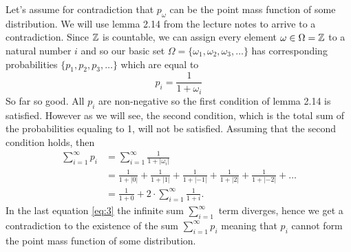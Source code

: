 Let's assume for contradiction that $ p_\omega$ can be the point mass function of some distribution.
We will use lemma 2.14 from the lecture notes to arrive to a contradiction.
Since $ \mathbb{Z}$ is countable, we can assign every element $ \omega \in \Omega = \mathbb{Z}$ to a natural number
$ i$ and so our basic set $ \Omega = \{ \omega_1, \omega_2, \omega_3,  \dots\} $ has corresponding
probabilities $ \{ p_1, p_2, p_3,\dots \} $ which are equal to 
\begin{equation}
    \label{eq:1}
    p_i = \frac{1}{1 + \omega_i} 
\end{equation}
So far so good. All $ p_i$ are non-negative so the first condition of lemma 2.14 is satisfied.
However as we will see, the second condition, which is the total sum of the probabilities equaling
to 1, will not be satisfied. Assuming that the second condition holds, then 
\begin{align}
    \sum_{i=1}^{\infty} p_i &= \sum_{i=1}^{\infty} \frac{1}{1 + |\omega_i|} \\
			    &= \frac{1}{1+|0|} + \frac{1}{1+|1|} + \frac{1}{1+ |-1|} + \frac{1}{1+|2|} + \frac{1}{1 + |-2|} + \dots \\
			    &= \frac{1}{1 + 0} + 2 \cdot \sum_{i=1}^{\infty} \frac{1}{1+i}. \label{eq:3} 
\end{align}
In the last equation \ref{eq:3} the infinite sum $ \sum_{i=1}^{\infty}$ term diverges, hence 
we get a contradiction to the existence of the sum $ \sum_{i=1}^{\infty} p_i$ meaning that $ p_i$
cannot form the point mass function of some distribution.
